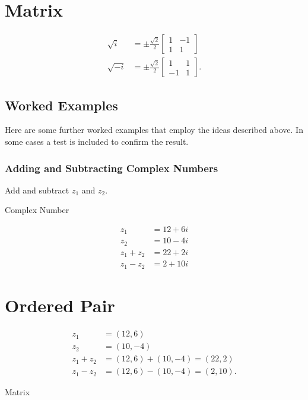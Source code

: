 \documentclass[10pt]{article}
\begin{document}
\section{Matrix}
$$
\begin{aligned}
\sqrt{i} & = \pm \frac{\sqrt{2}}{2}\left[\begin{array}{cc}
1 & -1 \\
1 & 1
\end{array}\right] \\
\sqrt{-i} & = \pm \frac{\sqrt{2}}{2}\left[\begin{array}{cc}
1 & 1 \\
-1 & 1
\end{array}\right] .
\end{aligned}
$$

\subsection{Worked Examples}
Here are some further worked examples that employ the ideas described above. In some cases a test is included to confirm the result.

\subsubsection{Adding and Subtracting Complex Numbers}
Add and subtract $z_{1}$ and $z_{2}$.

Complex Number

$$
\begin{aligned}
z_{1} & =12+6 i \\
z_{2} & =10-4 i \\
z_{1}+z_{2} & =22+2 i \\
z_{1}-z_{2} & =2+10 i
\end{aligned}
$$

\section{Ordered Pair}
$$
\begin{aligned}
z_{1} & =(12,6) \\
z_{2} & =(10,-4) \\
z_{1}+z_{2} & =(12,6)+(10,-4)=(22,2) \\
z_{1}-z_{2} & =(12,6)-(10,-4)=(2,10) .
\end{aligned}
$$

Matrix
\end{document}
